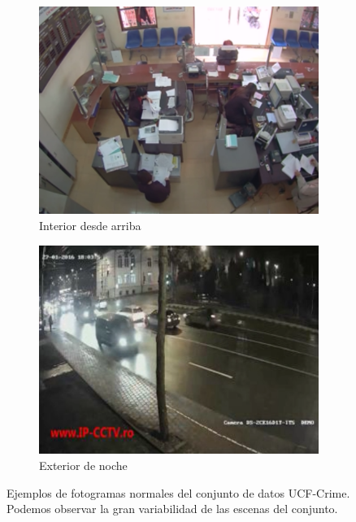\documentclass[../main.tex]{memoir}
\begin{document}
\begin{figure}[hbtp]
\begin{subfigure}{0.48\textwidth}
    \centering
    \includegraphics[width=\linewidth]{images/ucf-examples/normal-3}
    \caption{Interior desde arriba}
  \end{subfigure}
  \begin{subfigure}{0.48\textwidth}
    \centering
    \includegraphics[width=\linewidth]{images/ucf-examples/normal-4}
    \caption{Exterior de noche}
  \end{subfigure}
  \caption{Ejemplos de fotogramas normales del conjunto de datos
    UCF-Crime. Podemos observar la gran variabilidad de las escenas
    del conjunto.}
  \label{fig:ucf-normal-examples}
\end{figure}
\end{document}
